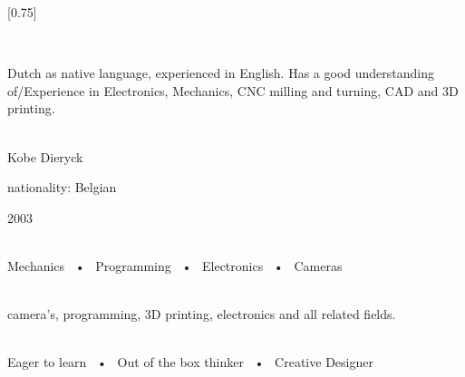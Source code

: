 \documentclass[lighthipster]{simplehipstercv}
\begin{document}
\setlength{\columnsep}{1.5cm}
[0.75]
\begin{paracol}{2}

\paracolbackgroundoptions



\footnotesize
{\setasidefontcolour
\flushright
\begin{center}
\end{center}

\\[0.5em]

{\footnotesize
Dutch as native language, experienced in English. Has a good understanding of/Experience in Electronics, Mechanics, CNC milling and turning, CAD and 3D printing.

\bigskip

 \\[0.5em]
Kobe Dieryck

nationality: Belgian 

2003

\bigskip

 \\[0.5em]

Mechanics ~•~ Programming ~•~ Electronics ~•~ Cameras

\bigskip



\bigskip

\\[0.5em]

camera's, programming, 3D printing, electronics and all related fields.
\bigskip

\\[0.5em]

Eager to learn ~•~ Out of the box thinker ~•~ Creative Designer

\vspace{4em}

\begin{flushleft}
    \\
    \\
\end{flushleft}
\vspace{-2em}
\hspace{0.5\textwidth}

}}
\end{paracol}
\end{document}
